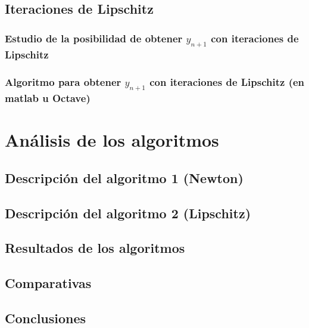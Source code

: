 \documentclass[letter, 10pt]{article}
\begin{document}
\subsection{Iteraciones de Lipschitz}
\subsubsection{Estudio de la posibilidad de obtener $y_{n+1}$ con iteraciones de Lipschitz}

\subsubsection{Algoritmo para obtener $y_{n+1}$ con iteraciones de Lipschitz (en
matlab u Octave)}


\section{Análisis de los algoritmos}
\subsection{Descripción del algoritmo 1 (Newton)}

\subsection{Descripción del algoritmo 2 (Lipschitz)}

\subsection{Resultados de los algoritmos}

\subsection{Comparativas}

\subsection{Conclusiones}

\end{document}
